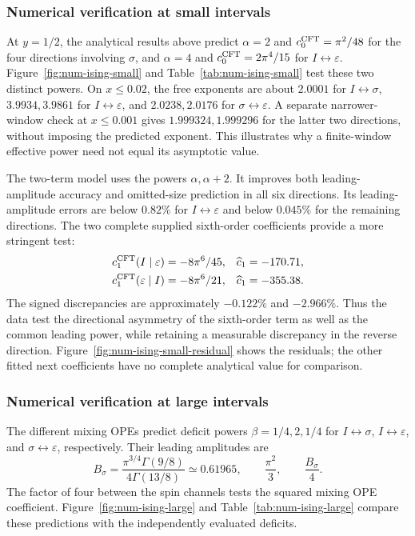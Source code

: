 \clearpage
\subsubsection{Numerical verification at small intervals}
\label{sec:num-ising-small}
At $y=1/2$, the analytical results above predict
$\alpha=2$ and $c_0^{\rm CFT}=\pi^2/48$ for the four directions
involving $\sigma$, and $\alpha=4$ and
$c_0^{\rm CFT}=2\pi^4/15$ for $I\leftrightarrow\varepsilon$.
Figure~\ref{fig:num-ising-small} and
Table~\ref{tab:num-ising-small} test these two distinct powers.
On $x\leq0.02$, the free exponents are about $2.0001$ for
$I\leftrightarrow\sigma$, $3.9934,3.9861$ for
$I\leftrightarrow\varepsilon$, and $2.0238,2.0176$ for
$\sigma\leftrightarrow\varepsilon$. A separate narrower-window
check at $x\leq0.001$ gives $1.999324,1.999296$ for the latter
two directions, without imposing the predicted exponent. This
illustrates why a finite-window effective power need not equal
its asymptotic value.

The two-term model uses the powers $\alpha,\alpha+2$.
It improves both leading-amplitude accuracy and omitted-size
prediction in all six directions. Its leading-amplitude errors
are below $0.82\%$ for $I\leftrightarrow\varepsilon$ and below
$0.045\%$ for the remaining directions. The two complete supplied
sixth-order coefficients provide a more stringent test:
\begin{align}
 c_1^{\rm CFT}(I\mid\varepsilon)&=-8\pi^6/45,
 &\widehat c_1&=-170.71,\nonumber\\
 c_1^{\rm CFT}(\varepsilon\mid I)&=-8\pi^6/21,
 &\widehat c_1&=-355.38.
 \label{eq:num-ising-second}
\end{align}
The signed discrepancies are approximately $-0.122\%$ and
$-2.966\%$. Thus the data test the directional asymmetry of the
sixth-order term as well as the common leading power, while
retaining a measurable discrepancy in the reverse direction.
Figure~\ref{fig:num-ising-small-residual} shows the residuals;
the other fitted next coefficients have no complete analytical
value for comparison.


\clearpage

\subsubsection{Numerical verification at large intervals}
\label{sec:num-ising-large}
The different mixing OPEs predict deficit powers
$\beta=1/4,2,1/4$ for $I\leftrightarrow\sigma$,
$I\leftrightarrow\varepsilon$, and
$\sigma\leftrightarrow\varepsilon$, respectively.
Their leading amplitudes are
\begin{equation}
 B_\sigma=\frac{\pi^{3/4}\Gamma(9/8)}{4\Gamma(13/8)}
 \simeq0.61965,\qquad \frac{\pi^2}{3},\qquad
 \frac{B_\sigma}{4}.
 \label{eq:num-ising-large-leading}
\end{equation}
The factor of four between the spin channels tests the squared
mixing OPE coefficient. Figure~\ref{fig:num-ising-large} and
Table~\ref{tab:num-ising-large} compare these predictions with
the independently evaluated deficits.

